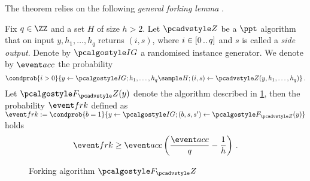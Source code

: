 \documentclass[runningheads,11pt]{llncs}
\begin{document}
The theorem relies on the following \emph{general forking lemma} \cite{JC:PoiSte00}.

\begin{lemma}
	\label{lem:forking_lemma}
	Fix $q \in \ZZ$ and a set $H$ of size $h > 2$. Let $\zdv$ be a $\ppt$
  algorithm that on input $y, h_1, \ldots, h_q$ returns $(i, s)$, where $i
  \in[0 \, .. \, q]$ and $s$ is called a \emph{side output}. Denote by $\ig$ a
  randomised instance generator. We denote by $\accProb$ the probability
	\[
		\condprob{i > 0}{y \gets \ig; h_1, \ldots, h_q \sample H; (i, s) \gets
		\zdv(y, h_1, \ldots, h_q)}\,.
	\]
	Let $\forking_\zdv(y)$ denote the algorithm described in
  \cref{fig:forking_lemma}, then the probability $\frkProb$ defined as $
  \frkProb := \condprob{b = 1}{y \gets \ig; (b, s, s') \gets \forking_{\zdv}(y)}
  $ holds
	\[
		\frkProb \geq \accProb \brak{\frac{\accProb}{q} - \frac{1}{h}}\,.
	\]
	\begin{figure}
		\centering
		\caption{Forking algorithm $\forking_\zdv$}
		\label{fig:forking_lemma}
\end{figure}
\end{lemma}
\end{document}
